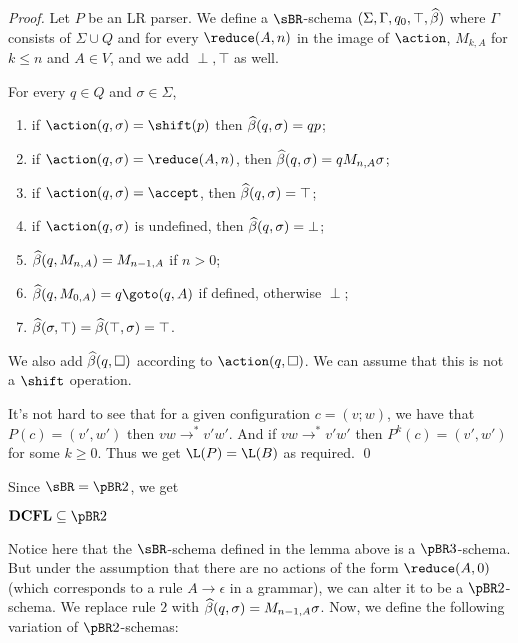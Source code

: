 \documentclass{llncs}
\begin{document}
\begin{proof}

    Let $P$ be an LR parser.
    We define a $\sBR$-schema $(\Sigma,\Gamma,q_0,\top,\widehat\beta)$ where $\Gamma$ consists of $\Sigma\cup Q$ and for every
    $\reduce(A,n)$ in the image of $\action$, $M_{k,A}$ for $k\leq n$ and $A\in V$, and we add $\perp,\top$ as well.

    For every $q\in Q$ and $\sigma\in\Sigma$,
    \begin{enumerate}
        \item if $\action(q,\sigma)=\shift(p)$ then $\widehat\beta(q,\sigma)=qp$;
        \item if $\action(q,\sigma)=\reduce(A,n)$, then $\widehat\beta(q,\sigma)=qM_{n,A}\sigma$;
        \item if $\action(q,\sigma)=\accept$, then $\widehat\beta(q,\sigma)=\top$;
        \item if $\action(q,\sigma)$ is undefined, then $\widehat\beta(q,\sigma)=\bot$;
        \item $\widehat\beta(q,M_{n,A})=M_{n-1,A}$ if $n>0$;
        \item $\hb(q,M_{0,A})=q\goto(q,A)$ if defined, otherwise $\perp$;
        \item $\widehat\beta(\sigma,\top)=\widehat\beta(\top,\sigma)=\top$.
    \end{enumerate}
    We also add $\widehat\beta(q,\square)$ according to $\action(q,\square)$.
    We can assume that this is not a $\shift$ operation.

    It's not hard to see that for a given configuration $c=(v;w)$, we have that $P(c)=(v',w')$ then $vw\to^* v'w'$.
    And if $vw\to^*v'w'$ then $P^k(c)=(v',w')$ for some $k\geq0$.
    Thus we get $\L(P)=\L(B)$ as required.
    \qed

\end{proof}

Since $\sBR=\pBR2$, we get

\begin{lemma}

    $\DCFL\subseteq\pBR2$

\end{lemma}

Notice here that the $\sBR$-schema defined in the lemma above is a $\pBR3$-schema.
But under the assumption that there are no actions of the form $\reduce(A,0)$ (which corresponds to a rule
$A\to\epsilon$ in a grammar), we can alter it to be a $\pBR2$-schema.
We replace rule $2$ with $\widehat\beta(q,\sigma)=M_{n-1,A}\sigma$.
Now, we define the following variation of $\pBR2$-schemas:
\end{document}
